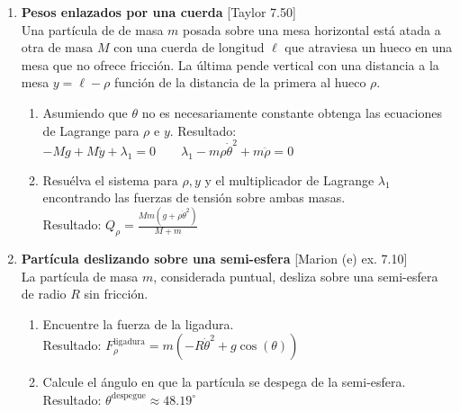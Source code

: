 \documentclass[11pt, spanish, a4paper, twoside]{article}
\begin{document}
\begin{enumerate}
	\item
	\begin{minipage}[t][6cm]{0.65\textwidth}
		\textbf{Pesos enlazados por una cuerda} [Taylor 7.50]\\
		Una partícula de de masa \(m\) posada sobre una mesa horizontal está atada a otra de masa \(M\) con una cuerda de longitud \(\ell\) que atraviesa un hueco en una mesa que no ofrece fricción.
		La última pende vertical con una distancia a la mesa \(y = \ell - \rho\) función de la distancia de la primera al hueco \(\rho\).
		\begin{enumerate}
			\item Asumiendo que \(\theta\) no es necesariamente constante obtenga las ecuaciones de Lagrange para \(\rho\) e  \(y\). Resultado:\\ \(- M g + M \ddot{y} + \lambda_{1} = 0 \qquad \lambda_{1} - m \rho \dot{\theta}^{2} + m \ddot{\rho} = 0\)
			\item Resuélva el sistema para \(\rho, y\) y el multiplicador de Lagrange \(\lambda_1\) encontrando las fuerzas de tensión sobre ambas masas.\\
			Resultado: \(Q_{\rho} = \frac{M m \left(g + \rho \dot{\theta}^{2}\right)}{M + m}\)
		\end{enumerate}
	\end{minipage}
	\begin{minipage}[c][0cm][t]{0.3\textwidth}
		
	\end{minipage}


	\item
	\begin{minipage}[t][4.5cm]{0.62\textwidth}
		\textbf{Partícula deslizando sobre una semi-esfera} [Marion (e) ex. 7.10]\\
		La partícula de masa \(m\), considerada puntual, desliza sobre una semi-esfera de radio \(R\) sin fricción.
		\begin{enumerate}
			\item Encuentre la fuerza de la ligadura.\\
			Resultado: \(F^\mathrm{ligadura}_{\rho} = m \left(- R \dot{\theta}^{2} + g \cos{\left(\theta \right)}\right)\)
			\item Calcule el ángulo en que la partícula se despega de la semi-esfera.\\
			Resultado: \(\theta^\mathrm{despegue} \approx 48.19^\circ\) 
		\end{enumerate}
	\end{minipage}
	\begin{minipage}[c][0cm][t]{0.3\textwidth}
		
	\end{minipage}
	

\end{enumerate}
\end{document}
